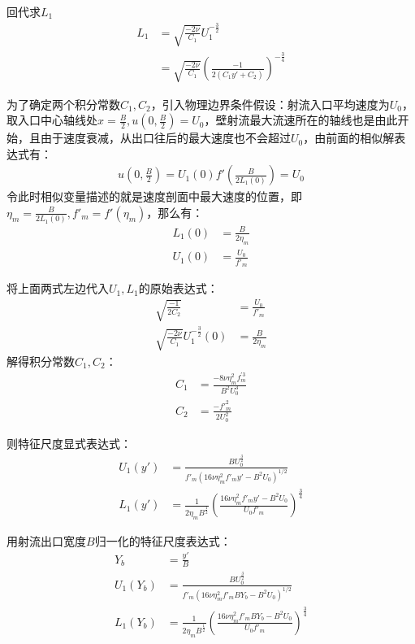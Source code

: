 回代求$L_{1}$
\begin{align}
    L_{1}&=\sqrt{\frac{-2\nu}{C_{1}}}U_{1}^{-\frac{3}{2}}\\
        &=\sqrt{\frac{-2\nu}{C_{1}}}\left(\frac{-1}{2(C_{1}y'+C_{2})}\right)^{-\frac{3}{4}}
\end{align}

为了确定两个积分常数$C_{1},C_{2}$，引入物理边界条件假设：射流入口平均速度为$U_{0}$，取入口中心轴线处$x=\frac{B}{2},u(0,\frac{B}{2})=U_{0}$，壁射流最大流速所在的轴线也是由此开始，且由于速度衰减，从出口往后的最大速度也不会超过$U_{0}$，由前面的相似解表达式有：
\begin{align}
    u(0,\frac{B}{2})=U_{1}(0)f'(\frac{B}{2L_{1}(0)})=U_{0}
\end{align}
令此时相似变量描述的就是速度剖面中最大速度的位置，即$\eta_{m}=\frac{B}{2L_{1}(0)},f'_{m}=f'(\eta_{m})$，那么有：
\begin{align}
    L_{1}(0)&=\frac{B}{2\eta_{m}}\\
    U_{1}(0)&=\frac{U_{0}}{f'_{m}}
\end{align}

将上面两式左边代入$U_{1},L_{1}$的原始表达式：
\begin{align}
    \sqrt{\frac{-1}{2C_{2}}}&=\frac{U_{0}}{f'_{m}}\\
    \sqrt{\frac{-2\nu}{C_{1}}}U_{1}^{-\frac{3}{2}}(0)&=\frac{B}{2\eta_{m}}
\end{align}
解得积分常数$C_{1},C_{2}$：
\begin{align}
    C_{1}&=\frac{-8\nu \eta_{m}^{2}f_{m}^{'3}}{B^{2}U_{0}^{3}}\\
    C_{2}&=\frac{-f'^{2}_{m}}{2U_{0}^{2}}
\end{align}

则特征尺度显式表达式：
\begin{align}
    U_{1}(y')&=\frac{BU_{0}^{\frac{3}{2}}}{f'_{m}(16\nu \eta^{2}_{m}f'_{m}y'-B^{2}U_{0})^{1/2}}\\
    L_{1}(y')&=\frac{1}{2\eta_{m}B^{\frac{1}{2}}}\left(\frac{16\nu \eta^{2}_{m}f'_{m}y'-B^{2}U_{0}}{U_{0}f'_{m}}\right)^{\frac{3}{4}}
\end{align}

用射流出口宽度$B$归一化的特征尺度表达式：
\begin{align}
    Y_{b}&=\frac{y'}{B}\\
    U_{1}(Y_{b})&=\frac{BU_{0}^{\frac{3}{2}}}{f'_{m}(16\nu \eta^{2}_{m}f'_{m}BY_{b}-B^{2}U_{0})^{1/2}}\\
    L_{1}(Y_{b})&=\frac{1}{2\eta_{m}B^{\frac{1}{2}}}\left(\frac{16\nu \eta^{2}_{m}f'_{m}BY_{b}-B^{2}U_{0}}{U_{0}f'_{m}}\right)^{\frac{3}{4}}
\end{align}

